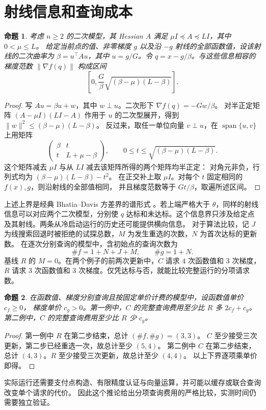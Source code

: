 \documentclass[UTF8,11pt]{ctexart}
\newcommand{\norm}[1]{\lVert #1\rVert}
\newtheorem{proposition}{命题}
\begin{document}
\section{射线信息和查询成本}
\begin{proposition}\label{prop:info}
考虑 $n\ge2$ 的二次模型，其 Hessian $A$ 满足 $\mu I\preceq A\preceq LI$，其中 $0<\mu\le L$。
给定当前点的值、非零梯度 $g$ 以及沿 $-g$ 射线的全部函数值，设该射线的二次曲率为
$\beta=u^\top Au$，其中 $u=g/G$。令 $q=x-g/\beta$。与这些信息相容的梯度范数 $\norm{\nabla f(q)}$ 构成区间
\[
  \left[0,\frac{G}{\beta}\sqrt{(\beta-\mu)(L-\beta)}\right].
\]
\end{proposition}
\begin{proof}
写 $Au=\beta u+w$，其中 $w\perp u$。二次形下 $\nabla f(q)=-Gw/\beta$。
对半正定矩阵 $(A-\mu I)(LI-A)$ 作用于 $u$ 的二次型展开，得到
$\norm{w}^2\le(\beta-\mu)(L-\beta)$。
反过来，取任一单位向量 $v\perp u$，在 $\operatorname{span}\{u,v\}$ 上用矩阵
\[
 \begin{pmatrix}\beta&t\\t&L+\mu-\beta\end{pmatrix},
 \qquad 0\le t\le \sqrt{(\beta-\mu)(L-\beta)}.
\]
这个矩阵减去 $\mu I$ 与从 $LI$ 减去该矩阵所得的两个矩阵均半正定：
对角元非负，行列式均为 $(\beta-\mu)(L-\beta)-t^2$。
在正交补上取 $\mu I$。对每个 $t$ 固定相同的 $f(x),g$，则沿射线的全部值相同，
并且梯度范数等于 $Gt/\beta$，取遍所述区间。
\end{proof}

上述上界是经典 Bhatia--Davis 方差界的谱形式 \cite{bd}。若上端严格大于 $\theta$，同样的射线信息可以对应两个二次模型，分别使 $q$ 达标和未达标。这个信息界只涉及给定点及其射线。两条从冷启动运行的历史还可能提供横向信息。
对于算法比较，记 $J$ 为线搜索回退时被拒绝的试探总数，$M$ 为发生重选的次数，$N$ 为首次达标的更新数。
在逐次分别查询的模型中，含初始点的查询次数为
\[
    \# f=1+N+J+M,\qquad \# g=1+N .
\]
基线 $R$ 的 $M=0$。在两个例子的前两次更新中，$C$ 请求 $4$ 次函数值和 $3$ 次梯度，
$R$ 请求 $3$ 次函数值和 $3$ 次梯度。仅凭达标与否，就能比较完整运行的分项请求数。

\begin{proposition}\label{prop:cost}
在函数值、梯度分别查询且按固定单价计费的模型中，设函数值单价 $c_f\ge0$，
梯度单价 $c_g>0$。第一例中，$C$ 的完整查询费用至少比 $R$ 多 $2c_f+c_g$。
第二例中，$C$ 的完整查询费用至少比 $R$ 少 $c_g$。
\end{proposition}
\begin{proof}
第一例中 $R$ 在第二步结束，总计 $(\#f,\#g)=(3,3)$。
$C$ 至少接受三次更新，第二步已经重选一次，故总计至少 $(5,4)$。
第二例中 $C$ 在第二步结束，总计 $(4,3)$。$R$ 至少接受三次更新，故总计至少 $(4,4)$。
以上下界逐项乘单价即得。
\end{proof}
实际运行还需要支付点构造、有限精度认证与向量运算，并可能以缓存或联合查询改变单个请求的代价。
因此这个推论给出分项查询费用的严格比较，实测时间仍需要独立验证。
\end{document}
